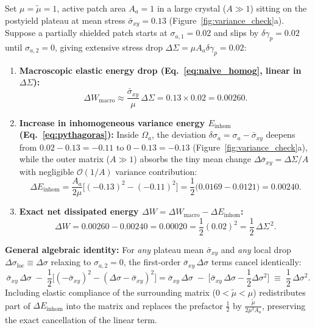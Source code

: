 \documentclass[11pt,a4paper]{article}
\newcommand{\dS}{\Delta\Sigma}
\newcommand{\dW}{\Delta W}
\newcommand{\sigbar}{\bar{\sigma}_{xy}}
\newcommand{\dsigloc}{\Delta\sigma_{\mathrm{loc}}}
\newcommand{\dgamp}{\delta\gamma_p}
\newcommand{\mutil}{\tilde{\mu}}
\begin{document}
Set $\mu = \mutil = 1$, active patch area $A_a = 1$ in a large crystal ($A \gg 1$) sitting on the postyield plateau at mean stress $\sigbar = 0.13$ (Figure~\ref{fig:variance_check}a). Suppose a partially shielded patch starts at $\sigma_{a,1} = 0.02$ and slips by $\dgamp = 0.02$ until $\sigma_{a,2} = 0$, giving extensive stress drop $\dS = \mu A_a \dgamp = 0.02$:
\begin{enumerate}[nosep]
  \item \textbf{Macroscopic elastic energy drop (Eq.~\ref{eq:naive_homog}, linear in $\dS$):}
  \[
  \Delta W_{\mathrm{macro}} \approx \frac{\sigbar}{\mu}\,\dS = 0.13 \times 0.02 = \mathbf{0.00260}.
  \]
  \item \textbf{Increase in inhomogeneous variance energy $E_{\mathrm{inhom}}$ (Eq.~\ref{eq:pythagoras}):}
  Inside $\Omega_a$, the deviation $\delta\sigma_a = \sigma_a - \sigbar$ deepens from $0.02 - 0.13 = -0.11$ to $0 - 0.13 = -0.13$ (Figure~\ref{fig:variance_check}a), while the outer matrix ($A\gg 1$) absorbs the tiny mean change $\Delta\sigbar = \dS/A$ with negligible $\mathcal{O}(1/A)$ variance contribution:
  \[
  \Delta E_{\mathrm{inhom}} = \frac{A_a}{2\mu}\Big[(-0.13)^2 - (-0.11)^2\Big]
  = \frac{1}{2}\big(0.0169 - 0.0121\big) = \mathbf{0.00240}.
  \]
  \item \textbf{Exact net dissipated energy $\dW = \Delta W_{\mathrm{macro}} - \Delta E_{\mathrm{inhom}}$:}
  \[
  \dW = 0.00260 - 0.00240 = \mathbf{0.00020} = \frac{1}{2}(0.02)^2 = \frac{1}{2}\,\dS^{\,2}.
  \]
\end{enumerate}
\textbf{General algebraic identity:} For \emph{any} plateau mean $\sigbar$ and \emph{any} local drop $\dsigloc \equiv \Delta\sigma$ relaxing to $\sigma_{a,2}=0$, the first-order $\sigbar\,\Delta\sigma$ terms cancel identically:
\begin{equation}
\label{eq:exact_identity}
\sigbar\,\Delta\sigma \;-\; \frac{1}{2}\Big[(-\sigbar)^2 - (\Delta\sigma - \sigbar)^2\Big]
= \sigbar\,\Delta\sigma \;-\; \Big[\sigbar\,\Delta\sigma - \frac{1}{2}\Delta\sigma^2\Big]
\;\equiv\; \frac{1}{2}\,\Delta\sigma^2.
\end{equation}
Including elastic compliance of the surrounding matrix ($0 < \mutil < \mu$) redistributes part of $\Delta E_{\mathrm{inhom}}$ into the matrix and replaces the prefactor $\frac{1}{2}$ by $\frac{\mutil}{2\mu^2 A_a}$, preserving the exact cancellation of the linear term.
\end{document}

